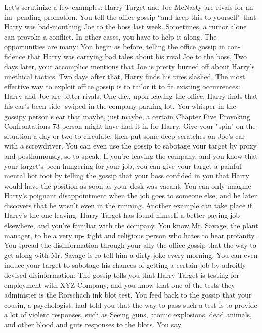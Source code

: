 \documentclass{book}
\begin{document}
Let's scrutinize a few examples: 
Harry Target and Joe McNasty are rivals for an im- 
pending promotion. You tell the office gossip “and keep 
this to yourself” that Harry was bad-mouthing Joe to 
the boss last week. 
Sometimes, a rumor alone can provoke a conflict. In other 
cases, you have to help it along. The opportunities are many: 
You begin as before, telling the office gossip in con- 
fidence that Harry was carrying bad tales about his 
rival Joe to the boss, Two days later, your accomplice 
mentions that Joe is pretty burned off about Harry's 
unethical tactics. Two days after that, Harry finds his 
tires slashed. 
The most effective way to exploit office gossip is to tailor it 
to fit existing occurrences: 
Harry and Joe are bitter rivals. One day, upon 
leaving the office, Harry finds that his car's been side- 
swiped in the company parking lot. You whisper in the 
gossipy person's ear that maybe, just maybe, a certain 
Chapter Five 
Provoking Confrontations 
73 
person might have had it in for Harry, Give your "spin" 
on the situation a day or two to circulate, then put some 
deep scratches on Joe's car with a screwdriver. 
You can even use the gossip to sabotage your target by 
proxy and posthumously, so to speak. If you're leaving the 
company, and you know that your target's been hungering for 
your job, you can give your target a painful mental hot foot by 
telling the gossip that your boss confided in you that Harry 
would have the position as soon as your desk was vacant. You 
can only imagine Harry's poignant disappointment when the job 
goes to someone else, and he later discovers that he wasn't even 
in the running. Another example can take place if Harry's the 
one leaving: 
Harry Target has found himself a better-paying job 
elsewhere, and you're familiar with the company. You 
know Mr. Savage, the plant manager, to be a very up- 
tight and religious person who hates to hear profanity. 
You spread the disinformation through your ally the 
office gossip that the way to get along with Mr. Savage 
is ro tell him a dirty joke every morning. 
You can even induce your target to sabotage his chances of 
getting a certain job by adroitly devised disinformation: 
The gossip tells you that Harry Target is testing for 
employment with XYZ Company, and you know that one 
of the tests they administer is the Rorschach ink blot 
test. You feed back to the gossip that your cousin, a 
psychologist, had told you that the way to pass such a 
test is to provide a lot of violent responses, such as 
Seeing guns, atomic explosions, dead animals, and 
other blood and guts responses to the blots. You say 
\end{document}
